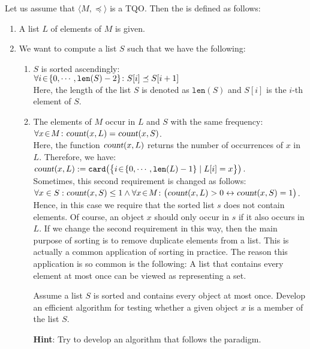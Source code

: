 Let us assume that $\langle M, \preceq \rangle$ is a  \textsc{TQO}.  Then the 
is defined as follows:
\begin{enumerate}
\item A list $L$ of elements of $M$ is given.
\item We want to compute a list $S$ such that we have the following: 
  \begin{enumerate}
  \item $S$ is sorted ascendingly: \\[0.2cm]
        \hspace*{1.3cm} 
        $\forall i \!\in\! \{ 0, \cdots, \texttt{len}(S)-2 \} \colon S[i] \preceq S[i+1]$ 
        \\[0.2cm]
        Here, the length of the list $S$ is denoted as $\texttt{len}(S)$ and $S[i]$ is the $i$-th element of $S$.
  \item The elements of $M$ occur in $L$ and $S$ with the same frequency: \\[0.2cm]
        \hspace*{1.3cm} 
        $\forall x\!\in\! M \colon \textsl{count}(x,L) = \textsl{count}(x,S)$.
        \\[0.2cm]
        Here, the function $\textsl{count}(x,L)$ returns the number of occurrences of $x$ in $L$.
        Therefore, we have: \\[0.2cm]
        \hspace*{1.3cm}
        $\textsl{count}(x,L) := \texttt{card}\bigl(\bigl\{ i \!\in\! \{0,\cdots,\texttt{len}(L)-1\} \mid L[i] = x \bigr\}\bigr)$.
        \\[0.2cm]
        Sometimes, this second requirement is changed as follows:
        \\[0.2cm]
        \hspace*{1.3cm}
        $\forall x \in S: \textsl{count}(x,S) \leq 1 \wedge \forall x\!\in\! M \colon \bigl(\textsl{count}(x,L) > 0 \leftrightarrow \textsl{count}(x,S) = 1\bigr)$.
        \\[0.2cm]
        Hence, in this case we require that the sorted list $s$ does not contain  elements.
        Of course, an object $x$ should only occur in $s$ if it also occurs in $L$.  If we change
        the second requirement in this way, then the main purpose of sorting is to remove duplicate
        elements from a list.  This is actually a common application of sorting in practice.  The
        reason this application is so common is the following: A list that contains every element at
        most once can be viewed as representing a set.

        \exercise
        Assume a list $S$ is sorted and contains every object at most once.  Develop an efficient
        algorithm for testing whether a given object $x$ is a member of the list $S$.

        \textbf{Hint}: Try to develop an algorithm that follows the 
        paradigm. 
  \end{enumerate}
\end{enumerate}
